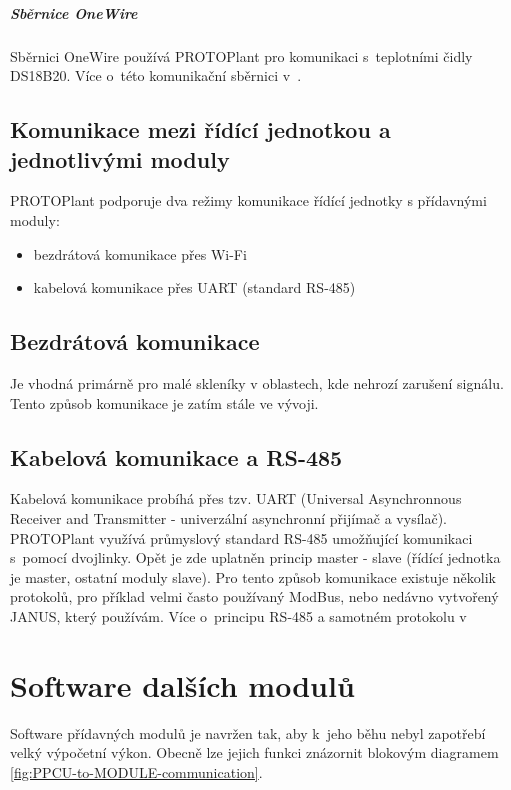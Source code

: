 \paragraph{Sběrnice OneWire}
Sběrnici OneWire používá PROTOPlant pro komunikaci s~teplotními čidly DS18B20. 
Více o~této komunikační sběrnici v~\cite{DS18B20}.

\section*{Komunikace mezi řídící jednotkou a jednotlivými moduly}
PROTOPlant podporuje dva režimy komunikace řídící jednotky s přídavnými moduly:
\begin{itemize}
    \item bezdrátová komunikace přes Wi-Fi
    \item kabelová komunikace přes UART (standard RS-485)
\end{itemize}

\section*{Bezdrátová komunikace}
Je vhodná primárně pro malé skleníky v oblastech, kde nehrozí zarušení signálu.
Tento způsob komunikace je zatím stále ve vývoji.

\section*{Kabelová komunikace a RS-485}
Kabelová komunikace probíhá přes tzv. UART (Universal Asynchronnous Receiver and Transmitter - univerzální asynchronní přijímač a vysílač).
PROTOPlant využívá průmyslový standard RS-485 umožňující komunikaci s~pomocí dvojlinky.
Opět je zde uplatněn princip master - slave (řídící jednotka je master, ostatní moduly slave).
Pro tento způsob komunikace existuje několik protokolů, pro příklad velmi často používaný ModBus, nebo nedávno vytvořený JANUS\cite{JANUS}, který používám. 
Více o~principu RS-485 a samotném protokolu v~\cite[21-25]{JANUS}

\chapter*{Software dalších modulů}

\label{chap:moduleSoftware}
Software přídavných modulů je navržen tak, aby k~jeho běhu nebyl zapotřebí velký výpočetní výkon.
Obecně lze jejich funkci znázornit blokovým diagramem \ref{fig:PPCU-to-MODULE-communication}.


